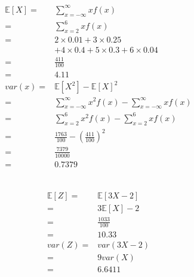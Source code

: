 \documentclass{article}
\begin{document}
        \subsection{}
            \begin{equation*}
                \begin{split}
                    \mathbb{E}[X]=&\sum_{x=-\infty}^\infty xf(x)\\
                        =&\sum_{x=2}^6 xf(x)\\
                        =&2\times 0.01+3\times 0.25\\
                        &+4\times 0.4+5\times0.3+6\times0.04\\
                        =&\frac{411}{100}\\
                        =&4.11\\
                    var(x)=&\mathbb{E}[X^2]-\mathbb{E}[X]^2\\
                        =&\sum_{x=-\infty}^\infty x^2f(x)-\sum_{x=-\infty}^\infty xf(x)\\
                        =&\sum_{x=2}^6 x^2f(x)-\sum_{x=2}^6 xf(x)\\
                        =&\frac{1763}{100}-(\frac{411}{100})^2\\
                        =&\frac{7379}{10000}\\
                        =&0.7379\\
                \end{split}
            \end{equation*}
        \subsection{}
            \begin{equation*}
                \begin{split}
                    \mathbb{E}[Z]=&\mathbb{E}[3X-2]\\
                        =&3\mathbb{E}[X]-2\\
                        =&\frac{1033}{100}\\
                        =&10.33\\
                    var(Z)=&var(3X-2)\\ 
                        =&9var(X)\\
                        =&6.6411\\
                \end{split}
            \end{equation*}
\end{document}

